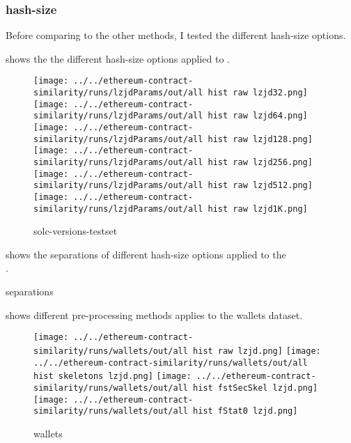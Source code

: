 \documentclass[../main.tex]{subfiles}
\begin{document}
\subsubsection{hash-size}
Before comparing to the other methods, I tested the different hash-size options.

 shows the the different hash-size options applied to .

\begin{figure}[ht!]
  \centering
  \texttt{[image: ../../ethereum-contract-similarity/runs/lzjdParams/out/all hist raw lzjd32.png]}%
  \texttt{[image: ../../ethereum-contract-similarity/runs/lzjdParams/out/all hist raw lzjd64.png]}%
  \texttt{[image: ../../ethereum-contract-similarity/runs/lzjdParams/out/all hist raw lzjd128.png]}\\
  \texttt{[image: ../../ethereum-contract-similarity/runs/lzjdParams/out/all hist raw lzjd256.png]}%
  \texttt{[image: ../../ethereum-contract-similarity/runs/lzjdParams/out/all hist raw lzjd512.png]}%
  \texttt{[image: ../../ethereum-contract-similarity/runs/lzjdParams/out/all hist raw lzjd1K.png]}\\

  \caption{solc-versions-testset}
  \label{fig:hist_solc_lzjd}
\end{figure}

 shows the separations of different hash-size options applied to the\\.

\begin{table}[ht!]
  \centering
  \caption{separations}
  \label{tbl:lz_sep}
\end{table}

 shows different pre-processing methods applies to the wallets dataset.

\begin{figure}[ht!]
  \centering
  \texttt{[image: ../../ethereum-contract-similarity/runs/wallets/out/all hist raw lzjd.png]}%
  \texttt{[image: ../../ethereum-contract-similarity/runs/wallets/out/all hist skeletons lzjd.png]}%
  \texttt{[image: ../../ethereum-contract-similarity/runs/wallets/out/all hist fstSecSkel lzjd.png]}%
  \texttt{[image: ../../ethereum-contract-similarity/runs/wallets/out/all hist fStat0 lzjd.png]}%
  \caption{wallets}
  \label{fig:hist_wallets_lzjd}
\end{figure}
\end{document}
